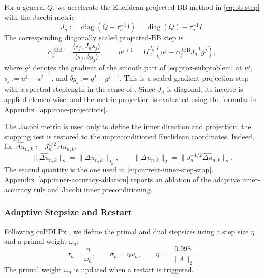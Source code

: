 \documentclass[letterpaper]{article} %
\theoremstyle{definition}
\theoremstyle{remark}
\begin{document}
For a general $Q$, we accelerate the Euclidean projected-BB method in
\eqref{eq:bb-step} with the Jacobi metric
\begin{equation}
\label{eq:jacobi-inner-metric}
    J_n
    :=\operatorname{diag}\!\left(Q+\tau_n^{-1}I\right)
    =\operatorname{diag}(Q)+\tau_n^{-1}I.
\end{equation}
The corresponding diagonally scaled projected-BB step is
\begin{equation}
\label{eq:jacobi-bb-step}
    \alpha_j^{\mathrm{JBB}}
    =
    \frac{\langle s_j,J_ns_j\rangle}
         {\langle s_j,\delta g_j\rangle},
    \qquad
    u^{j+1}
    =\Pi_{\mathcal X}^{J_n}
      \left(u^j-\alpha_j^{\mathrm{JBB}}J_n^{-1}g^j\right),
\end{equation}
where $g^j$ denotes the gradient of the smooth part of
\eqref{eq:prox-subproblem} at $u^j$, $s_j:=u^{j}-u^{j-1}$, and
$\delta g_j:=g^{j}-g^{j-1}$.  This is a scaled gradient-projection step with
a spectral steplength in the sense of \cite{bonettini2009scaled}.  Since
$J_n$ is diagonal, its inverse is applied elementwise, and the metric
projection is evaluated using the formulas in
Appendix~\ref{app:cone-projections}.

The Jacobi metric is used only to define the inner direction and projection;
the stopping test is restored to the unpreconditioned Euclidean coordinates.
Indeed, for
$\widehat{\Delta u}_{n,k}:=J_n^{1/2}\Delta u_{n,k}$,
\begin{equation}
\label{eq:jacobi-stop-unscale}
    \|\widehat{\Delta u}_{n,k}\|_2
    =\|\Delta u_{n,k}\|_{J_n},
    \qquad
    \|\Delta u_{n,k}\|_2
    =\|J_n^{-1/2}\widehat{\Delta u}_{n,k}\|_2.
\end{equation}
The second quantity is the one used in
\eqref{eq:current-inner-step-stop}.
Appendix~\ref{app:inner-accuracy-ablation} reports an ablation of the adaptive
inner-accuracy rule and Jacobi inner preconditioning.

\subsubsection{Adaptive Stepsize and Restart}

Following cuPDLPx \cite{lu2025cupdlpx}, we define the primal and dual
stepsizes using a step size $\eta$ and a primal weight $\omega_n$:
\begin{equation}
\label{eq:practical-stepsizes}
    \tau_n=\frac{\eta}{\omega_n},
    \qquad
    \sigma_n=\eta\omega_n,
    \qquad
    \eta:=\frac{0.998}{\|A\|_2}.
\end{equation}
The primal weight $\omega_n$ is updated when a restart is triggered.
\end{document}
